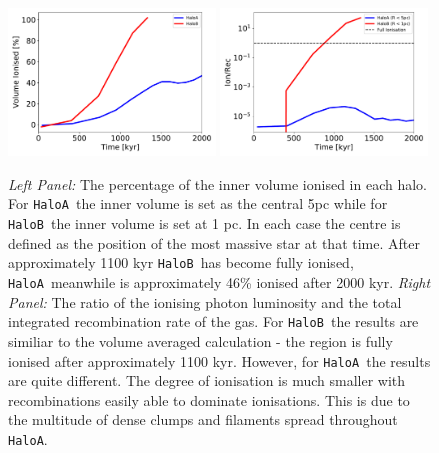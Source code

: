 \documentclass[graphics, twocolumn, usenatbib]{mn2e}
\newcommand{\ha} {\texttt{HaloA~}}
\newcommand{\hb} {\texttt{HaloB~}}
\newcommand{\hac} {\texttt{HaloA}}
\begin{document}
\begin{figure}
\centering
\begin{minipage}{175mm}      \begin{center} 
\centerline{
\includegraphics[width=0.49\textwidth]{FIGURES/Ionisation.pdf}
\includegraphics[width=0.49\textwidth]{FIGURES/Recombination.pdf}}
\caption{\textit{Left Panel:} The percentage of the inner volume ionised in each halo. For \ha the
    inner volume is set as the central 5pc while for \hb the inner volume is set at 1 pc. In each case
    the centre is defined as the position of the most massive star at that time. After approximately
    1100 kyr \hb has become fully ionised, \ha meanwhile is approximately 46\% ionised after 2000
    kyr. \textit{Right Panel:} The ratio of the ionising photon luminosity and the total integrated
    recombination rate of the gas. For \hb the results are similiar to the volume averaged
    calculation - the region is fully ionised after approximately 1100 kyr. However, for \ha the
    results are quite different. The degree of ionisation is much smaller with recombinations easily
    able to dominate ionisations. This is due to the multitude of dense clumps and filaments
    spread throughout \hac. 
  }  \label{Fig:Ionisation}
\end{center} \end{minipage}

\end{figure}
\end{document}
